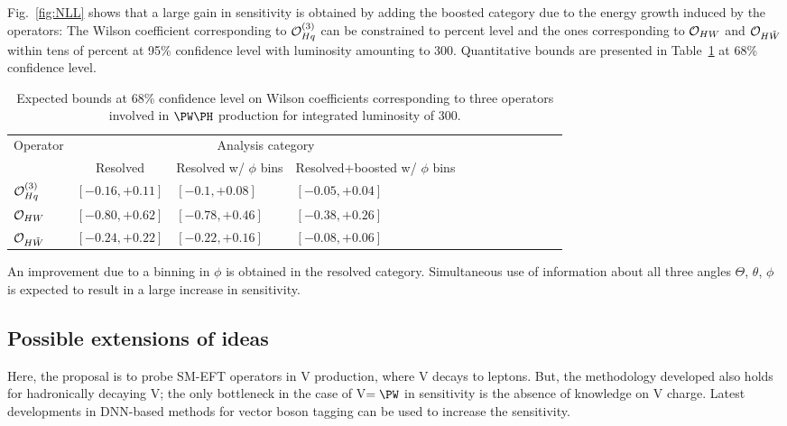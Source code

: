 \documentclass[a4paper,11pt]{article}
\renewcommand{\PV}{{{{V}}}\xspace}
\newcommand{\VH}{{{\PV}{\PH}}\xspace}
\begin{document}
Fig.~\ref{fig:NLL} shows that a large gain in sensitivity is obtained by adding the boosted category due to the energy growth induced by the operators:
The Wilson coefficient corresponding to ${\cal O}^{(3)}_{Hq}$ can be constrained to percent level and the ones corresponding to ${\cal O}_{HW}$ and ${\cal O}_{H\tilde{W}}$ within tens of percent at 95\% confidence level with luminosity amounting to 300\fbinv. 
Quantitative bounds are presented in Table~\ref{Tab:Limits} at 68\% confidence level.
{\renewcommand{\arraystretch}{1.3}
\begin{table}[htbp]
\caption{Expected bounds at 68\% confidence level on Wilson coefficients corresponding to three operators involved in $\PW\PH$ production for integrated luminosity of 300\fbinv.}
\begin{tabular}{lcl lcl lcl lcl}
\multirow{2}{*}{Operator} &
     \multicolumn{3}{c}{Analysis category} \\
    & Resolved & Resolved w/ $\phi$ bins & Resolved+boosted w/ $\phi$ bins \\
    ${\cal O}^{(3)}_{Hq}$    & $\left[-0.16,+0.11\right]$   & $\left[-0.1,+0.08\right]$  & $\left[-0.05,+0.04\right]$ \\
	${\cal O}_{HW}$          & $\left[-0.80,+0.62\right]$   & $\left[-0.78,+0.46\right]$  & $\left[-0.38,+0.26\right]$ \\
	${\cal O}_{H\tilde{W}}$  & $\left[-0.24,+0.22\right]$  &  $\left[-0.22,+0.16\right]$  & $\left[-0.08,+0.06\right]$ \\
  \end{tabular}
\label{Tab:Limits}
\end{table}
An improvement due to a binning in $\phi$ is obtained in the resolved category. 
Simultaneous use of information about all three angles $\Theta$, $\theta$, $\phi$ is expected to result in a large increase in sensitivity. 

\subsection{Possible extensions of ideas}

Here, the proposal is to probe SM-EFT operators in \VH production, where \PV decays to leptons. 
But, the methodology developed also holds for hadronically decaying \PV; 
the only bottleneck in the case of {\PV}$ ={\PW}$ in sensitivity is the absence of knowledge on \PV charge. 
Latest developments in DNN-based methods for vector boson tagging can be used to increase the sensitivity. 

}
\end{document}
